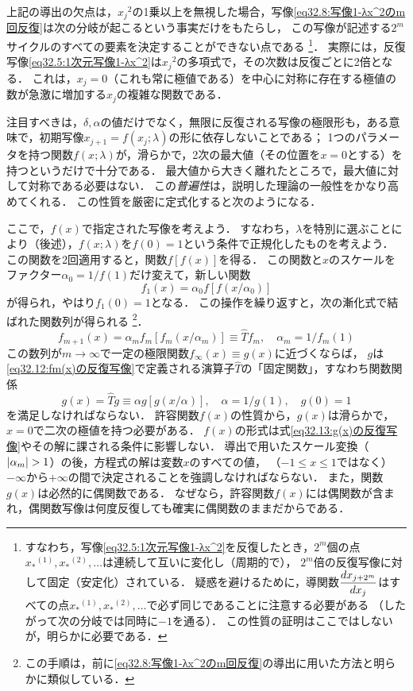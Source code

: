 上記の導出の欠点は，${x_j}^2$の1乗以上を無視した場合，写像\eqref{eq32.8:写像1-λx^2のm回反復}は次の分岐が起こるという事実だけをもたらし，
この写像が記述する$2^m$サイクルのすべての要素を決定することができない点である
\footnote{
すなわち，写像\eqref{eq32.5:1次元写像1-λx^2}を反復したとき，$2^m$個の点${x_*}^{(1)},{x_*}^{(2)}, \ldots$は連続して互いに変化し（周期的で），
$2^m$倍の反復写像に対して固定（安定化）されている．
疑惑を避けるために，導関数$\ddv{x_{j+2^m}}{x_j}$はすべての点${x_*}^{(1)},{x_*}^{(2)}, \ldots$で必ず同じであることに注意する必要がある
（したがって次の分岐では同時に$-1$を通る）．
この性質の証明はここではしないが，明らかに必要である．
}．
実際には，反復写像\eqref{eq32.5:1次元写像1-λx^2}は${x_j}^2$の多項式で，その次数は反復ごとに2倍となる．
これは，$x_j=0$（これも常に極値である）を中心に対称に存在する極値の数が急激に増加する$x_j$の複雑な関数である．



注目すべきは，$\delta,\alpha$の値だけでなく，無限に反復される写像の極限形も，ある意味で，初期写像$x_{j+1}=f(x_j;\lambda)$の形に依存しないことである；
1つのパラメータを持つ関数$f(x;\lambda)$が，滑らかで，2次の最大値（その位置を$x=0$とする）を持つというだけで十分である．
最大値から大きく離れたところで，最大値に対して対称である必要はない．
この\emph{普遍性}は，説明した理論の一般性をかなり高めてくれる．
この性質を厳密に定式化すると次のようになる．





ここで，$f(x)$で指定された写像を考えよう．
すなわち，$\lambda$を特別に選ぶことにより（後述），$f(x;\lambda)$を$f(0)=1$という条件で正規化したものを考えよう．
この関数を2回適用すると，関数$f[f(x)]$を得る．
この関数と$x$のスケールをファクター$\alpha_0 = 1/f(1)$だけ変えて，新しい関数
\[
    f_1(x) = \alpha_0 f[f(x/\alpha_0)]  
\]
が得られ，やはり$f_1(0)=1$となる．
この操作を繰り返すと，次の漸化式で結ばれた関数列が得られる
\footnote{この手順は，前に\eqref{eq32.8:写像1-λx^2のm回反復}の導出に用いた方法と明らかに類似している．}．
\begin{equation}\label{eq32.12:fm(x)の反復写像}
    f_{m+1}(x) = \alpha_m f_m[f_m(x/\alpha_m)] \equiv \hat{T} f_m, \quad
    \alpha_m = 1/f_m(1)
\end{equation}
この数列が$m\to\infty$で一定の極限関数$f_\infty(x)\equiv g(x)$に近づくならば，
$g$は\eqref{eq32.12:fm(x)の反復写像}で定義される演算子$\hat{T}$の「固定関数」，すなわち関数関係
\begin{equation}\label{eq32.13:g(x)の反復写像}
    g(x) = \hat{T} g \equiv \alpha g[g(x/\alpha)], \quad
    \alpha = 1/g(1), \quad g(0) = 1
\end{equation}
を満足しなければならない．
許容関数$f(x)$の性質から，$g(x)$は滑らかで，$x=0$で二次の極値を持つ必要がある．
$f(x)$の形式は式\eqref{eq32.13:g(x)の反復写像}やその解に課される条件に影響しない．
導出で用いたスケール変換（$\abs{\alpha_m}>1$）の後，方程式の解は変数$x$のすべての値，
（$-1 \leq x \leq 1$ではなく）$-\infty$から$+\infty$の間で決定されることを強調しなければならない．
また，関数$g(x)$は必然的に偶関数である．
なぜなら，許容関数$f(x)$には偶関数が含まれ，偶関数写像は何度反復しても確実に偶関数のままだからである．




